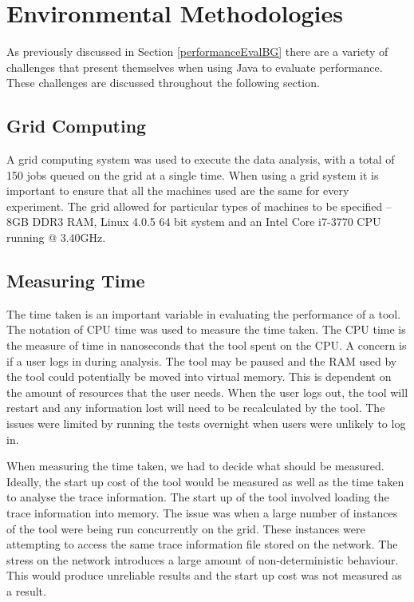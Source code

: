 \section{Environmental Methodologies}
\label{enviro}
As previously discussed in Section \ref{performanceEvalBG} there are a variety of challenges that present themselves when using Java to evaluate performance. These challenges are discussed throughout the following section.

\subsection{Grid Computing}
A grid computing system was used to execute the data analysis, with a total of 150 jobs queued on the grid at a single time. When using a grid system it is important to ensure that all the machines used are the same for every experiment. The grid allowed for particular types of machines to be specified -- 8GB DDR3 RAM, Linux 4.0.5 64 bit system and an Intel Core i7-3770 CPU running @ 3.40GHz.

\subsection{Measuring Time }
The time taken is an important variable in evaluating the performance of a tool. The notation of CPU time was used to measure the time taken. The CPU time is the measure of time in nanoseconds that the tool spent on the CPU. A concern is if a user logs in during analysis. The tool may be paused and the RAM used by the tool could potentially be moved into virtual memory. This is dependent on the amount of resources that the user needs. When the user logs out, the tool will restart and any information lost will need to be recalculated by the tool. The issues were limited by running the tests overnight when users were unlikely to log in.

When measuring the time taken, we had to decide what should be measured. Ideally, the start up cost of the tool would be measured as well as the time taken to analyse the trace information. The start up of the tool involved loading the trace information into memory. The issue was when a large number of instances of the tool were being run concurrently on the grid. These instances were attempting to access the same trace information file stored on the network. The stress on the network introduces a large amount of non-deterministic behaviour. This would produce unreliable results and the start up cost was not measured as a result.

